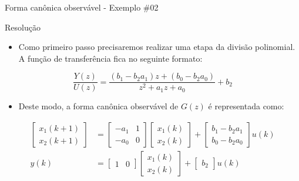 \begin{frame}{Forma canônica observável - Exemplo \#02}
\begin{block}{Resolução}
	\begin{itemize}
		\item Como primeiro passo precisaremos realizar uma etapa da divisão polinomial. A função de transferência fica no seguinte formato:
	\end{itemize}
	$$ \dfrac{Y(z)}{U(z)} = \dfrac{(b_1 - b_2a_1)z + (b_0 - b_2a_0)}{z^2 + a_1z + a_0} + b_2$$
	\begin{itemize}
		\item Deste modo, a forma canônica observável de $G(z)$ é representada como:
	\end{itemize}
	\begin{align*}
	\begin{bmatrix} x_1(k+1) \\ x_2(k+1) \end{bmatrix}
	&=
	\begin{bmatrix}
	-a_1 & 1 \\ -a_0 & 0
	\end{bmatrix}
	\begin{bmatrix}
	x_1(k) \\ x_2(k)
	\end{bmatrix}
	+
	\begin{bmatrix}
	b_1 - b_2a_1 \\ b_0 - b_2a_0
	\end{bmatrix}
	u(k) \\
	y(k)
	&=
	\begin{bmatrix}
	1 & 0
	\end{bmatrix}
	\begin{bmatrix}
	x_1(k) \\ x_2(k)
	\end{bmatrix}
	+
	\begin{bmatrix}
	b_2
	\end{bmatrix}
	u(k)
	\end{align*}
\end{block}
\end{frame}

